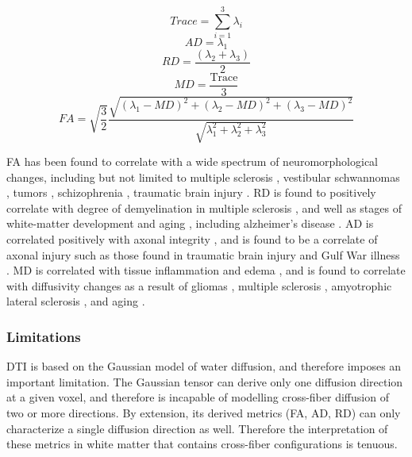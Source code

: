 \begin{equation}
Trace = \sum_{i=1}^{3} \lambda_i
\end{equation}
\begin{equation}
AD = \lambda_1
\end{equation}
\begin{equation}
RD = \frac{(\lambda_2+\lambda_3)}{2}
\end{equation}
\begin{equation}
MD = \frac{\text{Trace}}{3}
\end{equation}
\begin{equation}
FA = \sqrt{\frac{3}{2}}\frac{\sqrt{(\lambda_1-MD)^2 + (\lambda_2-MD)^2 + (\lambda_3-MD)^2}}{\sqrt{\lambda_1^2+\lambda_2^2+\lambda_3^2}}
\end{equation}

FA has been found to correlate with a wide spectrum of neuromorphological changes, including but not limited to multiple sclerosis \cite{Cercignani2001,Ciccarelli2003d,Miron2012}, vestibular schwannomas \cite{Chen2011b,Taoka2006,Wai2009}, tumors \cite{Mori2002,Schonberg2006,Nimsky2005}, schizophrenia \cite{Rametti2009,Fitzsimmons2009}, traumatic brain injury \cite{Bendlin2008,Kinnunen2011c,Hellyer2012}. RD is found to positively correlate with degree of demyelination in multiple sclerosis \cite{Song2005,Song2002,Klawiter2011,Janve2013}, and well as stages of white-matter development and aging \cite{Counsell2006,Sala2010}, including alzheimer's disease \cite{Acosta-Cabronero2012}. AD is correlated positively with axonal integrity \cite{Song2003}, and is found to be a correlate of axonal injury \cite{Budde2009} such as those found in traumatic brain injury \cite{Kinnunen2011c} and Gulf War illness \cite{Rayhan2013}. MD is correlated with tissue inflammation and edema \cite{Senda2012g}, and is found to correlate with diffusivity changes as a result of gliomas \cite{Stadlbauer2007}, multiple sclerosis \cite{Cercignani2001,Senda2012g,DeGroot2013}, amyotrophic lateral sclerosis \cite{Sharma2012}, and aging \cite{Kantarci2011}.

\subsubsection{Limitations}

DTI is based on the Gaussian model of water diffusion, and therefore imposes an important limitation. The Gaussian tensor can derive only one diffusion direction at a given voxel, and therefore is incapable of modelling cross-fiber diffusion of two or more directions. By extension, its derived metrics (FA, AD, RD) can only characterize a single diffusion direction as well. Therefore the interpretation of these metrics in white matter that contains cross-fiber configurations is tenuous.  

